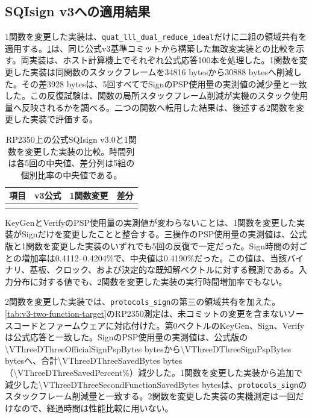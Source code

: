 \documentclass[a4paper,10pt]{ltjsarticle}
\theoremstyle{definition}
\theoremstyle{remark}
\begin{document}
\subsection{SQIsign v3への適用結果}
\label{sec:v3-results}

1関数を変更した実装は、\texttt{quat\_lll\_dual\_reduce\_ideal}だけに二組の領域共有を適用する。\cref{tab:v3-results}は、同じ公式v3基準コミットから構築した無改変実装との比較を示す。両実装は、ホスト計算機上でそれぞれ公式応答100本を処理した。1関数を変更した実装は同関数のスタックフレームを\num{34816} bytesから\num{30888} bytesへ削減した。その差\num{3928} bytesは、5回すべてでSignのPSP使用量の実測値の減少量と一致した。この反復試験は、関数の局所スタックフレーム削減が実機のスタック使用量へ反映されるかを調べる。二つの関数へ転用した結果は、後述する2関数を変更した実装で評価する。

\begin{table}[H]
  \centering
  \caption{RP2350上の公式SQIsign v3.0と1関数を変更した実装の比較。時間列は各5回の中央値、差分列は5組の個別比率の中央値である。}
  \label{tab:v3-results}
  \small
  \begin{tabular}{@{}lrrr@{}}
    \toprule
    項目 & v3公式 & 1関数変更 & 差分 \\
    \midrule
    \\
    \bottomrule
  \end{tabular}
\end{table}

KeyGenとVerifyのPSP使用量の実測値が変わらないことは、1関数を変更した実装がSignだけを変更したことと整合する。三操作のPSP使用量の実測値は、公式版と1関数を変更した実装のいずれでも5回の反復で一定だった。Sign時間の対ごとの増加率は\num{0.4112}--\num{0.4204}\%で、中央値は\num{0.4190}\%だった。この値は、当該バイナリ、基板、クロック、および決定的な既知解ベクトルに対する観測である。入力分布に対する値でも、2関数を変更した実装の実行時間増加率でもない。

2関数を変更した実装では、\texttt{protocols\_sign}の第三の領域共有を加えた。\cref{tab:v3-two-function-target}のRP2350測定は、未コミットの変更を含まないソースコードとファームウェアに対応付けた。第0ベクトルのKeyGen、Sign、Verifyは公式応答と一致した。SignのPSP使用量の実測値は、公式版の\num{\VThreeDThreeOfficialSignPspBytes} bytesから\num{\VThreeDThreeSignPspBytes} bytesへ、合計\num{\VThreeDThreeSavedBytes} bytes（\num{\VThreeDThreeSavedPercent}\%）減少した。1関数を変更した実装から追加で減少した\num{\VThreeDThreeSecondFunctionSavedBytes} bytesは、\texttt{protocols\_sign}のスタックフレーム削減量と一致する。2関数を変更した実装の実機測定は一回だけなので、経過時間は性能比較に用いない。
\end{document}
